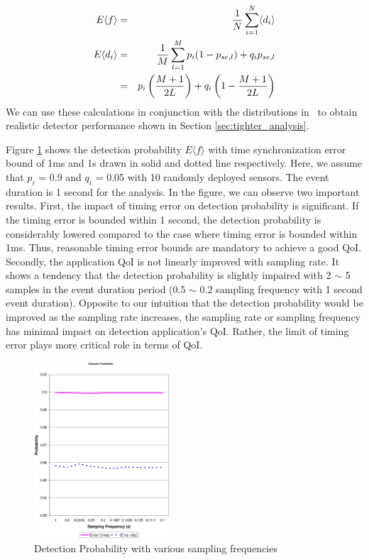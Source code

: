 \begin{eqnarray}
  E\langle f\rangle &=& {1\over N}\sum_{i=1}^N\langle d_i \rangle\nonumber\\
  E\langle d_i \rangle&=& {1\over M}\sum_{l=1}^M p_i(1-p_{se,l})+q_ip_{se,l}\nonumber\\
  &=& p_i\left( {M+1 \over 2L}\right)+q_i\left(1- {M+1 \over 2L}\right)\label{eqn:heterog_detector_mean}
\end{eqnarray}
We can use these calculations in conjunction with the distributions
in~\cite{timing-error} to obtain realistic detector performance
shown in Section \ref{sec:tighter_analysis}.

Figure \ref{fig:detection} shows the detection probability $E\langle
f\rangle$ with time synchronization error bound of 1ms and 1s drawn
in solid and dotted line respectively. Here, we assume that $p_i$ =
0.9 and $q_i$ = 0.05 with 10 randomly deployed sensors. The event
duration is 1 second for the analysis. In the figure, we can observe
two important results. First, the impact of timing error on
detection probability is significant. If the timing error is bounded
within 1 second, the detection probability is considerably lowered
compared to the case where timing error is bounded within 1ms. Thus,
reasonable timing error bounds are mandatory to achieve a good QoI.
Secondly, the application QoI is not linearly improved with sampling
rate. It shows a tendency that the detection probability is slightly
impaired with 2 $\sim$ 5 samples in the event duration period (0.5
$\sim$ 0.2 sampling frequency with 1 second event duration).
Opposite to our intuition that the detection probability would be
improved as the sampling rate increases, the sampling rate or
sampling frequency has minimal impact on detection application's
QoI. Rather, the limit of timing error plays more critical role in
terms of QoI.

\begin{figure}
    \begin{center}

    \includegraphics[height=0.3\textheight,width=0.45\textwidth,bbllx=49,bblly=101,bburx=585,bbury=714]{figures/detectionfig}
    \caption{Detection Probability with various sampling frequencies}
        \label{fig:detection}
    \end{center}
\end{figure}
